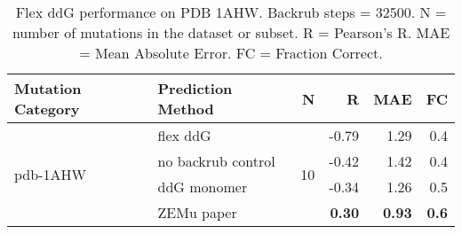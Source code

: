 \begin{table}
  \begin{tabular}{llrrrr}
\toprule
Mutation Category &   Prediction Method &   N &     R &  MAE &  FC \\
\midrule
 \multirow{ 4}{*}{pdb-1AHW} & flex ddG & \multirow{ 4}{*}{10} & -0.79 & 1.29 & 0.4  \\
 & no backrub control & & -0.42 & 1.42 & 0.4  \\
 & ddG monomer & & -0.34 & 1.26 & 0.5  \\
 & ZEMu paper & & \textbf{0.30} & \textbf{0.93} & \textbf{0.6}  \\
\bottomrule
\end{tabular}
  \caption[Flex ddG performance on PDB 1AHW]{
    Flex ddG performance on PDB 1AHW. Backrub steps = 32500. N = number of mutations in the dataset or subset. R = Pearson's R. MAE = Mean Absolute Error. FC = Fraction Correct.
  } \label{tab:table-pdb-1AHW}
\end{table}
